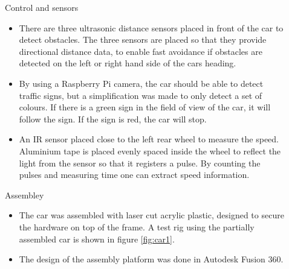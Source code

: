\documentclass[final,hyperref={pdfpagelabels=false}]{beamer}
\begin{document}
\begin{frame}[t]
\begin{columns}[t]
\begin{column}{.465\textwidth}
\end{column} %

\begin{column}{.03\textwidth}\end{column} %
 
\begin{column}{.465\textwidth} %


\begin{block}{Control and sensors}

    \begin{itemize}
        \item There are three ultrasonic distance sensors placed in front of the car to detect obstacles. The three sensors are placed so that they provide directional distance data, to enable fast avoidance if obstacles are detected on the left or right hand side of the cars heading. 
        
        \item By using a Raspberry Pi camera, the car should be able to detect traffic signs, but a simplification was made to only detect a set of colours. If there is a green sign in the field of view of the car, it will follow the sign. If the sign is red, the car will stop.  
        
        \item An IR sensor placed close to the left rear wheel to measure the speed. Aluminium tape is placed evenly spaced inside the wheel to reflect the light from the sensor so that it registers a pulse. By counting the pulses and measuring time one can extract speed information.
    \end{itemize}
    
    \end{block}



    \begin{block}{Assembley}

        \begin{itemize}
            \item The car was assembled with laser cut acrylic plastic, designed to secure the hardware on top of the frame. A test rig using the partially assembled car is shown in figure \ref{fig:car1}.
            \item The design of the assembly platform was done in Autodesk Fusion 360.
            

\end{itemize}
\end{block}
\end{column}
\end{columns}
\end{frame}
\end{document}
